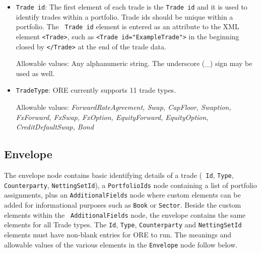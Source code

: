 \begin{itemize}
\item {\tt Trade id}: The first element of each trade is the {\tt Trade id} and it is used to identify trades within a
  portfolio. Trade ids should be unique within a portfolio.  The {\tt
    Trade id} element is entered as an attribute to the XML element {\tt <Trade>}, such as {\tt <Trade id="ExampleTrade">}
  in the beginning closed by {\tt </Trade>} at the end of the trade data.

Allowable values:  Any alphanumeric string. The underscore (\_) sign may be used as well. 


\item {\tt TradeType}: %
ORE currently supports 11 trade types.

Allowable values: \emph{ForwardRateAgreement, Swap, CapFloor, Swaption, FxForward, FxSwap, FxOption,
EquityForward, EquityOption, CreditDefaultSwap, Bond}

\end{itemize}

\subsection{Envelope}\label{ss:envelope}
The envelope node contains basic identifying details of a trade ({\tt
  Id}, {\tt Type}, {\tt Counterparty}, {\tt NettingSetId}), a 
{\tt PortfolioIds} node containing a list of portfolio assignments, 
plus an {\tt AdditionalFields} node where custom
elements can be added for informational purposes such as {\tt Book} or
{\tt Sector}. Beside the custom elements within the {\tt
  AdditionalFields} node, the envelope contains the same elements for
all Trade types.  The {\tt Id}, {\tt Type}, {\tt Counterparty} and
{\tt NettingSetId} elements must have non-blank entries for ORE to
run. 
The meanings and allowable values of the various elements in the \lstinline!Envelope!  node follow below.

